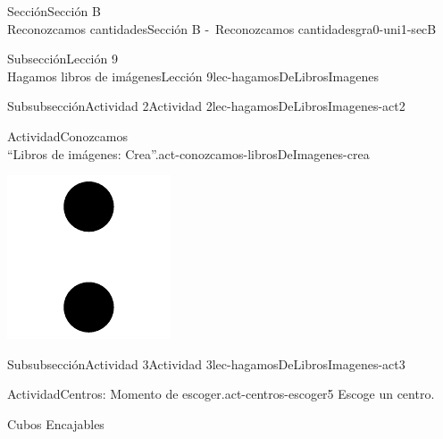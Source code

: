 \begin{sectionptx}{Sección}{{\Large Sección B\\}Reconozcamos cantidades}{}{Sección B -~Reconozcamos cantidades}{}{}{gra0-uni1-secB}
\begin{subsectionptx}{Subsección}{{\normalsize Lección 9\\[-0.05cm]}Hagamos libros de imágenes}{}{Lección 9}{}{}{lec-hagamosDeLibrosImagenes}
\begin{subsubsectionptx}{Subsubsección}{Actividad 2}{}{Actividad 2}{}{}{lec-hagamosDeLibrosImagenes-act2}
\begin{activity}{Actividad}{Conozcamos\\“Libros de imágenes: Crea”.}{act-conozcamos-librosDeImagenes-crea}
\begin{sidebyside}{2}{0.3}{0.3}{0}
\begin{sbspanel}{0.2}
\includegraphics[max width=\linewidth, center]{external/svg-source/tikz-file-148154.pdf}
\end{sbspanel}%
\end{sidebyside}%
\end{activity}%
\end{subsubsectionptx}
%
%
\typeout{************************************************}
\typeout{************************************************}
%
\clearpage
\begin{subsubsectionptx}{Subsubsección}{Actividad 3}{}{Actividad 3}{}{}{lec-hagamosDeLibrosImagenes-act3}
\begin{activity}{Actividad}{Centros: Momento de escoger.}{act-centros-escoger5}%
Escoge un centro.%
\begin{sidebyside}{2}{0.025}{0.025}{0.05}%
\begin{sbspanel}{0.45}%
Cubos Encajables%
\par

\end{sbspanel}
\end{sidebyside}
\end{activity}
\end{subsubsectionptx}
\end{subsectionptx}
\end{sectionptx}

